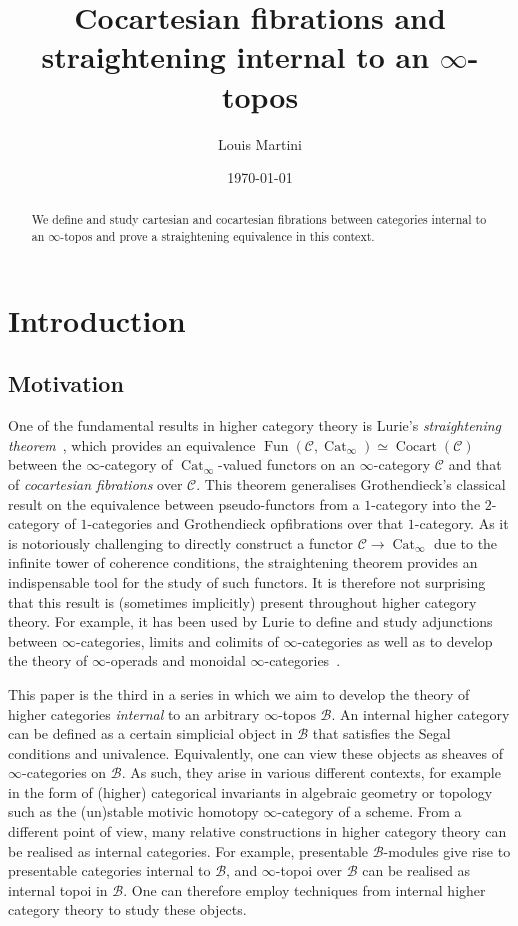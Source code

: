 \documentclass[reqno]{amsart}
\title{Cocartesian fibrations and straightening internal to an $\infty$-topos}
\author{Louis Martini}
\date{\today}
\numberwithin{equation}{subsection}
\theoremstyle{plain}
\theoremstyle{definition}
\let\scr=\mathcal
\def\BB{\scr B}
\def\CC{\scr C}
\DeclareMathOperator{\Cat}{Cat}
\DeclareMathOperator{\Cocart}{Cocart}
\DeclareMathOperator{\Fun}{Fun}
\newcommand{\CatS}{\Cat_{\infty}}
\begin{document}
\begin{abstract}
We define and study cartesian and cocartesian fibrations between categories internal to an $\infty$-topos and prove a straightening equivalence in this context.
\end{abstract}
\maketitle
\setcounter{tocdepth}{1}
\tableofcontents

\section{Introduction}

\subsection*{Motivation}
One of the fundamental results in higher category theory is Lurie's \emph{straightening theorem}~\cite{htt}, which provides an equivalence $\Fun(\CC,\CatS)\simeq\Cocart(\CC)$ between the $\infty$-category of $\CatS$-valued functors on an $\infty$-category $\CC$ and that of \emph{cocartesian fibrations} over $\CC$. This theorem generalises Grothendieck's classical result on the equivalence between pseudo-functors from a $1$-category into the $2$-category of $1$-categories and Grothendieck opfibrations over that $1$-category. As it is notoriously challenging to directly construct a functor $\CC\to\CatS$ due to the infinite tower of coherence conditions, the straightening theorem provides an indispensable tool for the study of such functors. It is therefore not surprising that this result is (sometimes implicitly) present throughout higher category theory. For example, it has been used by Lurie to define and study adjunctions between $\infty$-categories, limits and colimits of $\infty$-categories as well as to develop the theory of $\infty$-operads and monoidal $\infty$-categories~\cite{htt, Lurie2017}.

This paper is the third in a series in which we aim to develop the theory of higher categories \emph{internal} to an arbitrary $\infty$-topos $\BB$. An internal higher category can be defined as a certain simplicial object in $\BB$ that satisfies the Segal conditions and univalence. Equivalently, one can view these objects as sheaves of $\infty$-categories on $\BB$.  As such, they arise in various different contexts, for example in the form of (higher) categorical invariants in algebraic geometry or topology such as the (un)stable motivic homotopy $\infty$-category of a scheme. From a different point of view, many relative constructions in higher category theory can be realised as internal categories. For example, presentable $\BB$-modules give rise to presentable categories internal to $\BB$, and $\infty$-topoi over $\BB$ can be realised as internal topoi in $\BB$. One can therefore employ techniques from internal higher category theory to study these objects.
\end{document}
